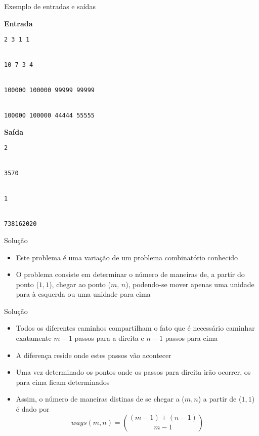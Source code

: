 \begin{frame}[fragile]{Exemplo de entradas e saídas}

\begin{minipage}[t]{0.55\textwidth}
\textbf{Entrada}
\begin{verbatim}
2 3 1 1


10 7 3 4


100000 100000 99999 99999


100000 100000 44444 55555
\end{verbatim}
\end{minipage}
\begin{minipage}[t]{0.4\textwidth}
\textbf{Saída}
\begin{verbatim}
2


3570


1


738162020
\end{verbatim}
\end{minipage}
\end{frame}

\begin{frame}[fragile]{Solução}

    \begin{itemize}
        \item Este problema é uma variação de um problema combinatório conhecido

        \item O problema consiste em determinar o número de maneiras de, a partir do ponto
            ($1, 1$), chegar ao ponto ($m$, $n$), podendo-se mover apenas uma unidade para à esquerda
                ou uma unidade para cima

%            

    \end{itemize}

\end{frame}


\begin{frame}[fragile]{Solução}

    \begin{itemize}
        \item Todos os diferentes caminhos compartilham o fato que é necessário caminhar 
            exatamente $m - 1$ passos para a direita e $n - 1$ passos para cima

        \item A diferença reside onde estes passos vão acontecer

        \item Uma vez determinado os pontos onde os passos para direita irão ocorrer, os para
            cima ficam determinados

        \item Assim, o número de maneiras distinas de se chegar a ($m, n$) a partir de ($1, 1$)
            é dado por
        \[
            ways(m, n) = \binom{(m - 1) + (n - 1)}{m - 1}
        \]
    \end{itemize}

\end{frame}

